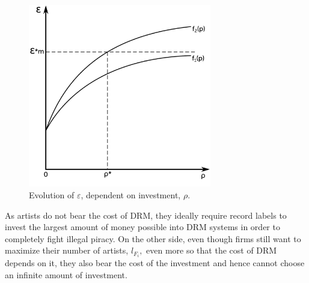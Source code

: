 \documentclass[a4paper,12pt]{article}
\numberwithin{equation}{section}
\begin{document}
\begin{figure}[h!]
\centering
\includegraphics[width=8cm]{Graphics/graph1.pdf}
\caption{Evolution of $\varepsilon$, dependent on investment, $\rho$.}
\label{Fig:EpsilonEvolution}
\end{figure}

As artists do not bear the cost of DRM, they ideally require record
labels to invest the largest amount of money possible into DRM systems
in order to completely fight illegal piracy. On the other side, even
though firms still want to maximize their number of artists, $l_{F_{i}},$
even more so that the cost of DRM depends on it, they also bear the
cost of the investment and hence cannot choose an infinite amount
of investment.\\
\end{document}
